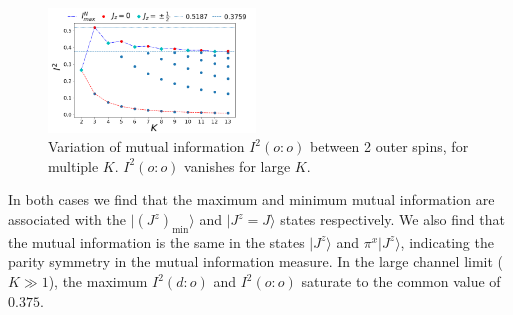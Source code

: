 \documentclass[reprint,prb,superscriptaddress]{revtex4-2}
\begin{document}
\begin{figure}[!htpb]
\includegraphics[width=0.49\textwidth]{NEW31DecI2vsNc12}
\caption{Variation of mutual information $I^2(o:o)$ between 2 outer spins, for multiple $K$. $I^2(o:o)$ vanishes for large $K$.}
\label{fig:MI_o_o}
\end{figure}

In both cases we find that the maximum and minimum mutual information are associated with the $|\left(J^z\right)_\mathrm{min}\rangle$ and $|J^z=J\rangle$ states respectively.
We also find that the  mutual information is the same in the states $|J^z\rangle$ and $\pi^x|J^z\rangle$, indicating the parity symmetry in the mutual information measure.
In the large channel limit ($K\gg 1$), the maximum \(I^2(d:o)\) and \(I^2(o:o)\) saturate to the common value of $0.375$.
\end{document}
